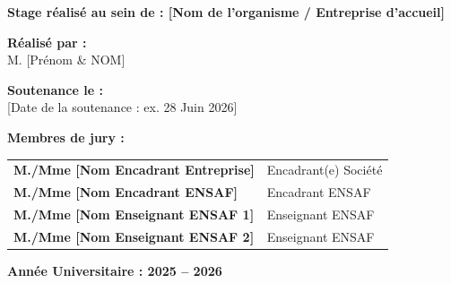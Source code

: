 \begin{titlepage}
\begin{center}
    {\large \textbf{Stage r\'ealis\'e au sein de : [Nom de l'organisme / Entreprise d'accueil]}}\\[0.5cm]
\end{center}

\vfill

\noindent
\begin{minipage}[t]{0.48\textwidth}
    \textbf{R\'ealis\'e par :}\\[0.2cm]
    M. [Pr\'enom \& NOM]
\end{minipage}
\hfill
\begin{minipage}[t]{0.48\textwidth}
    \raggedleft
    \textbf{Soutenance le :}\\[0.2cm]
    [Date de la soutenance : ex. 28 Juin 2026]
\end{minipage}

\vspace{0.7cm}

\noindent
\textbf{Membres de jury :}\\[0.15cm]
\begin{tabularx}{\textwidth}{@{}p{6.5cm} X@{}}
    \textbf{M./Mme [Nom Encadrant Entreprise]} & Encadrant(e) Soci\'et\'e \\
    \textbf{M./Mme [Nom Encadrant ENSAF]}     & Encadrant ENSAF \\
    \textbf{M./Mme [Nom Enseignant ENSAF 1]}  & Enseignant ENSAF \\
    \textbf{M./Mme [Nom Enseignant ENSAF 2]}  & Enseignant ENSAF \\
\end{tabularx}

\vfill

\begin{center}
    \small \textbf{Ann\'ee Universitaire : 2025 -- 2026}
\end{center}

\end{titlepage}
